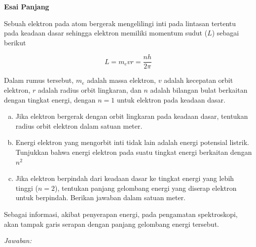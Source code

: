 \documentclass[11pt,fleqn]{exam}
\begin{document}
\begin{questions}
\vspace{1.5cm}
\textbf{Esai Panjang}

\question Sebuah elektron pada atom bergerak mengelilingi inti pada lintasan tertentu pada keadaan dasar sehingga elektron memiliki momentum sudut ($L$) sebagai berikut

$$L = m_e v r = \frac{nh}{2\pi}$$

Dalam rumus tersebut, $m_e$ adalah massa elektron, $v$ adalah kecepatan orbit elektron, $r$ adalah radius orbit lingkaran, dan $n$ adalah bilangan bulat berkaitan dengan tingkat energi, dengan $n = 1$ untuk elektron pada keadaan dasar.
\begin{enumerate}[a.]
	\item Jika elektron bergerak dengan orbit lingkaran pada keadaan dasar, tentukan radius orbit elektron dalam satuan meter.
	\item Energi elektron yang mengorbit inti tidak lain adalah energi potensial listrik. Tunjukkan bahwa energi elektron pada suatu tingkat energi berkaitan dengan $n^2$
	\item Jika elektron berpindah dari keadaan dasar ke tingkat energi yang lebih tinggi ($n=2$), tentukan panjang gelombang energi yang diserap elektron untuk berpindah. Berikan jawaban dalam satuan meter.
\end{enumerate}
Sebagai informasi, akibat penyerapan energi, pada pengamatan spektroskopi, akan tampak garis serapan dengan panjang gelombang energi tersebut.


\textit{Jawaban: }


\end{questions}
\end{document}
